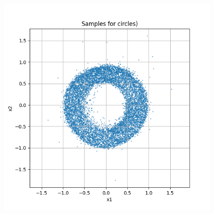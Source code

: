 \documentclass[a4paper,12pt]{article}
\begin{document}
\begin{figure}[h]
\begin{minipage}{0.3\textwidth}
  \end{minipage}
  \begin{minipage}{0.3\textwidth}
      \centering
      \includegraphics[width=\linewidth]{"images/Samples for ddpm_2_50_0.0001_0.02_circles.png"}
  \end{minipage}

  \vspace{0.5cm}


\end{figure}
\end{document}
